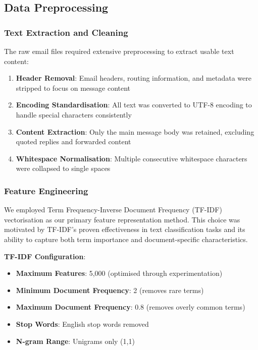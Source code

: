 \documentclass[11pt,a4paper]{article}
\begin{document}
\subsection{Data Preprocessing}

\subsubsection{Text Extraction and Cleaning}

The raw email files required extensive preprocessing to extract usable text content:

\begin{enumerate}
    \item \textbf{Header Removal}: Email headers, routing information, and metadata were stripped to focus on message content
    \item \textbf{Encoding Standardisation}: All text was converted to UTF-8 encoding to handle special characters consistently
    \item \textbf{Content Extraction}: Only the main message body was retained, excluding quoted replies and forwarded content
    \item \textbf{Whitespace Normalisation}: Multiple consecutive whitespace characters were collapsed to single spaces
\end{enumerate}

\subsubsection{Feature Engineering}

We employed Term Frequency-Inverse Document Frequency (TF-IDF) vector\-isation as our primary feature representation method. This choice was motivated by TF-IDF's proven effectiveness in text classification tasks and its ability to capture both term importance and document-specific characteristics.

\textbf{TF-IDF Configuration}:
\begin{itemize}
    \item \textbf{Maximum Features}: 5,000 (optimised through experimentation)
    \item \textbf{Minimum Document Frequency}: 2 (removes rare terms)
    \item \textbf{Maximum Document Frequency}: 0.8 (removes overly common terms)
    \item \textbf{Stop Words}: English stop words removed
    \item \textbf{N-gram Range}: Unigrams only (1,1)
\end{itemize}
\end{document}
